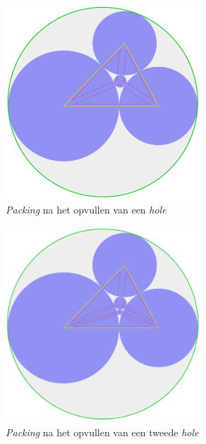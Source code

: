 \documentclass[12pt,a4paper,oneside]{book}
\begin{document}
{\begin{figure}
  \centering
  \includegraphics[width=0.65\textwidth]{voorbeeld-gat-stap-2.png}
  \caption{\textit{Packing} na het opvullen van een \textit{hole}} \label{fig:voorbeeld-gat-stap-2} 
\end{figure}

\begin{figure}
  \centering
  \includegraphics[width=0.65\textwidth]{voorbeeld-gat-stap-3.png}
  \caption{\textit{Packing} na het opvullen van een tweede \textit{hole}} \label{fig:voorbeeld-gat-stap-3} 
\end{figure}

}
\end{document}
